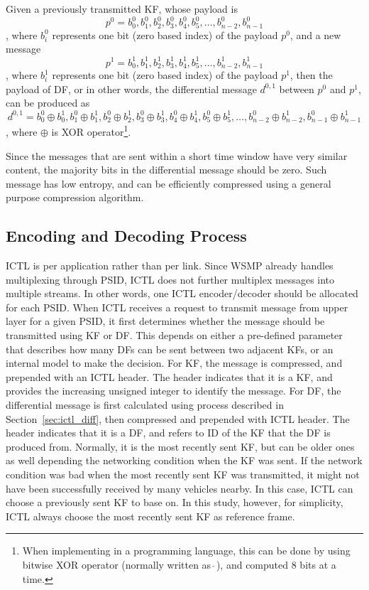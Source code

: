 \documentclass[12pt]{report}
\begin{document}
Given a previously transmitted KF, whose payload is
\begin{equation}
  p^0={b^0_0,b^0_1,b^0_2,b^0_3,b^0_4,b^0_5,\ldots,b^0_{n-2},b^0_{n-1}}
\end{equation}
, where $b^0_i$ represents one bit (zero based index) of the payload $p^0$, and a new message
\begin{equation}
  p^1={b^1_0,b^1_1,b^1_2,b^1_3,b^1_4,b^1_5,\ldots,b^1_{n-2},b^1_{n-1}}
\end{equation}
, where $b^1_i$ represents one bit (zero based index) of the payload $p^1$, then the payload of DF, or in other words, the differential message $d^{0,1}$ between $p^0$ and $p^1$, can be produced as
\begin{equation}
  d^{0,1}={b^0_0\oplus b^1_0,b^0_1\oplus b^1_1,b^0_2\oplus b^1_2,b^0_3\oplus b^1_3,b^0_4\oplus b^1_4,b^0_5\oplus b^1_5,\ldots,b^0_{n-2}\oplus b^1_{n-2},b^0_{n-1}\oplus b^1_{n-1}}
\end{equation}
, where $\oplus $ is XOR operator\footnote{When implementing in a programming language, this can be done by using bitwise XOR operator (normally written as $\hat{\ }$), and computed 8 bits at a time.}.

Since the messages that are sent within a short time window have very similar content, the majority bits in the differential message should be zero. Such message has low entropy, and can be efficiently compressed using a general purpose compression algorithm.

\subsection{Encoding and Decoding Process}
\label{sec:ictl_process}

ICTL is per application rather than per link. Since WSMP already handles multiplexing through PSID, ICTL does not further multiplex messages into multiple streams. In other words, one ICTL encoder/decoder should be allocated for each PSID. When ICTL receives a request to transmit message from upper layer for a given PSID, it first determines whether the message should be transmitted using KF or DF. This depends on either a pre-defined parameter that describes how many DFs can be sent between two adjacent KFs, or an internal model to make the decision. For KF, the message is compressed, and prepended with an ICTL header. The header indicates that it is a KF, and provides the increasing unsigned integer to identify the message. For DF, the differential message is first calculated using process described in Section~\ref{sec:ictl_diff}, then compressed and prepended with ICTL header. The header indicates that it is a DF, and refers to ID of the KF that the DF is produced from. Normally, it is the most recently sent KF, but can be older ones as well depending the networking condition when the KF was sent. If the network condition was bad when the most recently sent KF was transmitted, it might not have been successfully received by many vehicles nearby. In this case, ICTL can choose a previously sent KF to base on. In this study, however, for simplicity, ICTL always choose the most recently sent KF as reference frame.
\end{document}
